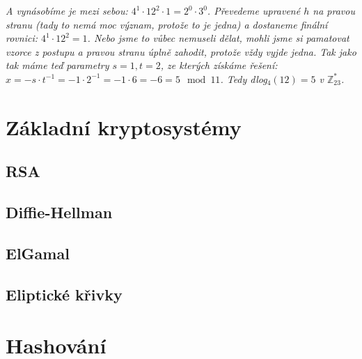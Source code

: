\documentclass[10pt,a4paper]{article}
\begin{document}
\begin{enumerate}
\textit{A vynásobíme je mezi sebou: $4^1\cdot 12^2 \cdot 1 = 2^0\cdot 3^0$. Převedeme upravené $h$ na pravou stranu (tady to nemá moc význam, protože to je jedna) a dostaneme finální rovnici: $4^1\cdot 12^2  = 1$. Nebo jsme to vůbec nemuseli dělat, mohli jsme si pamatovat vzorce z postupu a pravou stranu úplně zahodit, protože vždy vyjde jedna. Tak jako tak máme teď parametry $s=1, t=2$, ze kterých získáme řešení: $x = -s\cdot t^{-1} = -1 \cdot 2^{-1} = -1 \cdot 6 = -6 = 5 \mod 11$. Tedy dlog$_4(12) = 5$ v $\mathbb{Z}_{23}^*$.}

\end{enumerate}

\section{Základní kryptosystémy}
\subsection{RSA}
\subsection{Diffie-Hellman}
\subsection{ElGamal}
\subsection{Eliptické křivky}

\section{Hashování}
\end{document}
